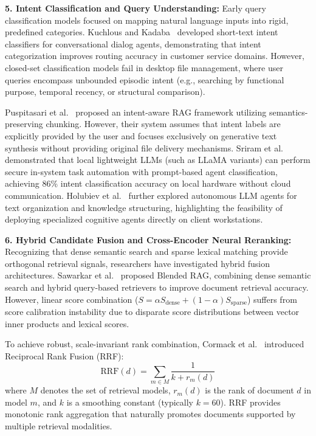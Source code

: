 \documentclass[a4paper,12pt]{article}
\begin{document}
\vspace{0.8em}
\noindent\textbf{5. Intent Classification and Query Understanding:}
Early query classification models focused on mapping natural language inputs into rigid, predefined categories. Kuchlous and Kadaba~\cite{kuchlous2020intent} developed short-text intent classifiers for conversational dialog agents, demonstrating that intent categorization improves routing accuracy in customer service domains. However, closed-set classification models fail in desktop file management, where user queries encompass unbounded episodic intent (e.g., searching by functional purpose, temporal recency, or structural comparison).

Puspitasari et al.~\cite{puspitasari2026intent} proposed an intent-aware RAG framework utilizing semantics-preserving chunking. However, their system assumes that intent labels are explicitly provided by the user and focuses exclusively on generative text synthesis without providing original file delivery mechanisms. Sriram et al.~\cite{sriram2024local} demonstrated that local lightweight LLMs (such as LLaMA variants) can perform secure in-system task automation with prompt-based agent classification, achieving 86\% intent classification accuracy on local hardware without cloud communication. Holubiev et al.~\cite{holubiev2024agents} further explored autonomous LLM agents for text organization and knowledge structuring, highlighting the feasibility of deploying specialized cognitive agents directly on client workstations.

\vspace{0.8em}
\noindent\textbf{6. Hybrid Candidate Fusion and Cross-Encoder Neural Reranking:}
Recognizing that dense semantic search and sparse lexical matching provide orthogonal retrieval signals, researchers have investigated hybrid fusion architectures. Sawarkar et al.~\cite{sawarkar2024blended} proposed Blended RAG, combining dense semantic search and hybrid query-based retrievers to improve document retrieval accuracy. However, linear score combination ($S = \alpha S_{\text{dense}} + (1-\alpha) S_{\text{sparse}}$) suffers from score calibration instability due to disparate score distributions between vector inner products and lexical scores.

To achieve robust, scale-invariant rank combination, Cormack et al.~\cite{cormack2009reciprocal} introduced Reciprocal Rank Fusion (RRF):
\begin{equation}
\text{RRF}(d) = \sum_{m \in M} \frac{1}{k + r_m(d)}
\end{equation}
where $M$ denotes the set of retrieval models, $r_m(d)$ is the rank of document $d$ in model $m$, and $k$ is a smoothing constant (typically $k=60$). RRF provides monotonic rank aggregation that naturally promotes documents supported by multiple retrieval modalities.
\end{document}
